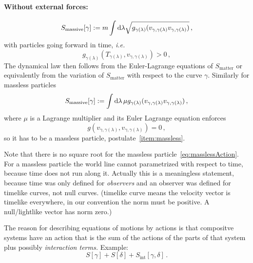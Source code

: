 \documentclass[11pt, a4paper, twocolumn]{article} %
\begin{document}
    \paragraph{Without external forces:}
    \begin{equation}
        S_\text{massive}[\gamma] := m\int\operatorname{d\!}\lambda\sqrt{g_{\gamma(\lambda)} ( v_{\gamma, \gamma(\lambda)} v_{\gamma, \gamma(\lambda)})}\,,
    \end{equation}
    with particles going forward in time, \textit{i.e.}
    \begin{equation}
        g_{\gamma(\lambda)} \left( T_{\gamma(\lambda)}, v_{\gamma, \gamma(\lambda)} \right) > 0\,,
    \end{equation}
    The dynamical law then follows from the Euler-Lagrange equations of $S_\text{matter}$ or equivalently
    from the variation of $S_\text{matter}$ with respect to the curve $\gamma$.
    Similarly for massless particles
    \begin{equation}
        S_\text{massive}[\gamma] := \int\operatorname{d\!}\lambda\, \mu g_{\gamma(\lambda)} ( v_{\gamma, \gamma(\lambda)} v_{\gamma, \gamma(\lambda)})\,,
        \label{eq:massiveAction}
    \end{equation}
    where $\mu$ is a Lagrange multiplier and its Euler Lagrange equation enforces
    \begin{equation}
        g\left( v_{\gamma, \gamma(\lambda)}, v_{\gamma, \gamma(\lambda)} \right) = 0\,,
        \label{eq:masslessAction}
    \end{equation}
    so it has to be a massless particle, postulate~\ref{item:massless}.
    \begin{note}
        Note that there is no square root for the massless particle~\ref{eq:masslessAction}.
        For a massless particle the world line cannot parametrized with respect to time,
        because time does not run along it.
        Actually this is a meaningless statement, because time was only defined for
        \textit{observers} and an observer was defined for timelike curves, not null curves.
        (timelike curve means the velocity vector is timelike everywhere, in our convention
        the norm must be positive. A null/lightlike vector has norm zero.)
    \end{note}

    \begin{note}
        The reason for describing equations of motions by actions is that compositve systems have
        an action that is the sum of the actions of the parts of that system plus possibly
        \textit{interaction terms.}
        Example:
        \begin{equation}
            S[\gamma] + S[\delta] + S_\text{int}[\gamma,\delta]\,.
        \end{equation}
    \end{note}
\end{document}
